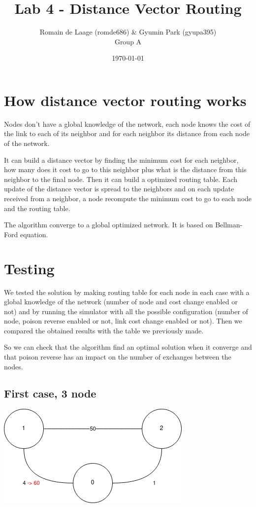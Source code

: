 \documentclass[a4paper,11pt,final]{report}
\title{Lab 4 - Distance Vector Routing}
\author{Romain de Laage (romde686) \& Gyumin Park (gyupa395)\\Group A}
\date{\today}
\begin{document}
\maketitle

\chapter{How distance vector routing works}

Nodes don't have a global knowledge of the network, each node knows the
cost of the link to each of its neighbor and for each neighbor its
distance from each node of the network.

It can build a distance vector by finding the minimum cost for each
neighbor, how many does it cost to go to this neighbor plus what is the
distance from this neighbor to the final node. Then it can build a
optimized routing table. Each update of the distance vector is spread to
the neighbors and on each update received from a neighbor, a node
recompute the minimum cost to go to each node and the routing table.

The algorithm converge to a global optimized network. It is based on
Bellman-Ford equation.

\chapter{Testing}

We tested the solution by making routing table for each node in each
case with a global knowledge of the network (number of node and cost
change enabled or not) and by running the simulator with all the
possible configuration (number of node, poison reverse enabled or not,
link cost change enabled or not). Then we compared the obtained results
with the table we previously made.

So we can check that the algorithm find an optimal solution when it
converge and that poison reverse has an impact on the number of
exchanges between the nodes.

\section{First case, 3 node}

\includegraphics{upload_297bfbc7629abe89b072b536cf2e93ef.png}
\end{document}
